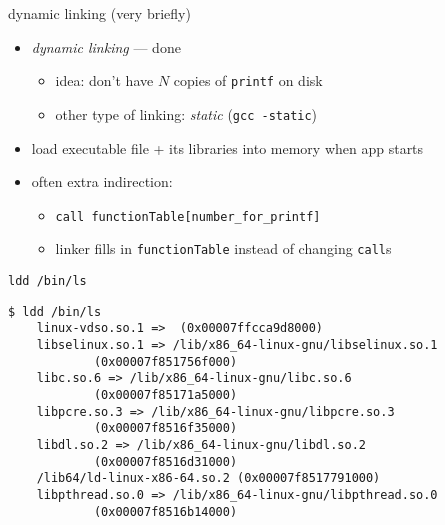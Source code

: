 \begin{frame}{dynamic linking (very briefly)}
    \begin{itemize}
        \item \textit{dynamic linking} --- done 
            \begin{itemize}
                \item idea: don't have $N$ copies of {\tt printf} on disk
                \item other type of linking: \textit{static} ({\tt gcc -static})
            \end{itemize}
        \item load executable file + its libraries into memory when app starts
        \item often extra indirection:
            \begin{itemize}
            \item {\tt call functionTable[number\_for\_printf]}
            \item linker fills in {\tt functionTable} instead of changing {\tt call}s
            \end{itemize}
    \end{itemize}
\end{frame}

\begin{frame}[fragile,label=lddBinLs]{\tt ldd /bin/ls}
\begin{Verbatim}[fontsize=\fontsize{12}{13}\selectfont]
$ ldd /bin/ls
    linux-vdso.so.1 =>  (0x00007ffcca9d8000)
    libselinux.so.1 => /lib/x86_64-linux-gnu/libselinux.so.1
            (0x00007f851756f000)
    libc.so.6 => /lib/x86_64-linux-gnu/libc.so.6
            (0x00007f85171a5000)
    libpcre.so.3 => /lib/x86_64-linux-gnu/libpcre.so.3
            (0x00007f8516f35000)
    libdl.so.2 => /lib/x86_64-linux-gnu/libdl.so.2
            (0x00007f8516d31000)
    /lib64/ld-linux-x86-64.so.2 (0x00007f8517791000)
    libpthread.so.0 => /lib/x86_64-linux-gnu/libpthread.so.0
            (0x00007f8516b14000)
\end{Verbatim}
\end{frame}


